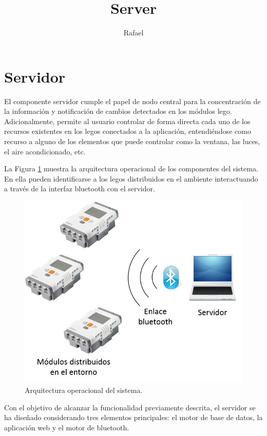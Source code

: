 \documentclass[12pt]{article}
\begin{document}
\title{Server}
\author{Rafael}

\maketitle

\section{Servidor} %
\label{sec:servidor}
El componente servidor cumple el papel de nodo central para la concentración de la información y notificación de cambios detectados en los módulos lego.
Adicionalmente, permite al usuario controlar de forma directa cada uno de los recursos existentes en los legos conectados a la aplicación, entendiéndose como recurso a alguno de los elementos que puede controlar como la ventana, las luces, el aire acondicionado, etc.

La Figura \ref{sec:servidor} muestra la arquitectura operacional de los componentes del sistema.
En ella pueden identificarse a los legos distribuidos en el ambiente interactuando a través de la interfaz bluetooth con el servidor.

\begin{figure}
\centering
\includegraphics[width=\textwidth]{imagenes/arquitectura-operacional}
\caption[Arquitectura operacional]{Arquitectura operacional del sistema.}
\label{fig:arquitectura-operacional}
\end{figure}

Con el objetivo de alcanzar la funcionalidad previamente descrita, el servidor se ha diseñado considerando tres elementos principales: el motor de base de datos, la aplicación web y el motor de bluetooth.
\end{document}
